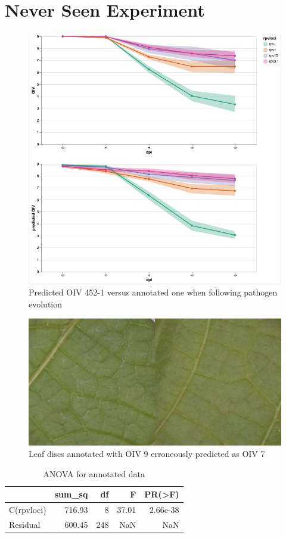 \documentclass[english]{article}
\begin{document}
\section{Never Seen Experiment}

\begin{figure}[H]
    \centering
    \includegraphics[width=0.8\linewidth]{p_viticola//resources//images/cmp_2023_oiv_evo.png}
    \caption{Predicted OIV 452-1 versus annotated one when following pathogen evolution}
    \label{fig:newexpprog}
\end{figure}


\begin{figure}[H]
    \centering
    \includegraphics[width=0.5\linewidth]{p_viticola//resources//images/nexexppatcherror.png}
    \caption{Leaf discs annotated with OIV 9 erroneously predicted as OIV 7}
    \label{fig:newexperror}
\end{figure}


\begin{table}[H]
\centering
\caption{ANOVA for annotated data}
\label{tab:oivannova}
\begin{tabular}{lrrrr}
\toprule
{} &      sum\_sq &     df &          F &        PR(>F) \\
\midrule
C(rpvloci) &  716.93 &    8 &  37.01 &  2.66e-38 \\
Residual   &  600.45 &  248 &        NaN &           NaN \\
\bottomrule
\end{tabular}
\end{table}
\end{document}
